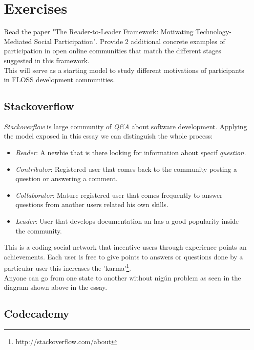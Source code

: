 \documentclass[11pt]{scrartcl}
\begin{document}
\section{Exercises}

    Read the paper "The Reader-to-Leader Framework: Motivating Technology-Mediated Social  Participation". Provide 2 additional concrete examples of participation in open online communities that match the different stages suggested in this framework.\\

    This will serve as a starting model to study different motivations of participants in FLOSS development communities.
    
    \subsection{Stackoverflow}
    
	\emph{Stackoverflow} is large community of \emph{Q\&A} about software development. Applying the model exposed in this essay we can distinguish the whole process:
	
	\begin{itemize}
	
		\item \emph{Reader}: A newbie that is there looking for information about specif \emph{question}.
		\item \emph{Contributor}: Registered user that comes back to the community posting a question or answering a comment.
		\item \emph{Collaborator}: Mature registered user that comes frequently to answer questions from another users related his own skills.
		\item \emph{Leader}: User that develops documentation an has a good popularity inside the community.
	\end{itemize}
	
	This is a coding social network that incentive users through experience points an achievements. Each user is free to give points to answers or questions done by a particular user this increases the 'karma'\footnote{http://stackoverflow.com/about}.\\
	
	Anyone can go from one state to another without nigún problem as seen in the diagram shown above in the essay.	

    \subsection{Codecademy}
    
\end{document}
